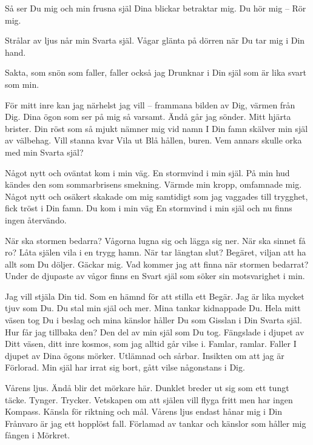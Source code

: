 Så ser Du mig och min frusna själ
Dina blickar betraktar mig.
Du hör mig – 
Rör mig.


Strålar av ljus når min
Svarta själ.
Vågar glänta på dörren
när Du tar mig i Din hand.


Sakta, som snön som faller,
faller också jag
Drunknar i Din själ
som är lika svart som min.
\stoppoem

\startpoem
För mitt inre kan jag
närhelst jag vill – 
frammana bilden av Dig,
värmen från Dig.
Dina ögon som ser på mig
så varsamt.
Ändå går jag sönder.
Mitt hjärta brister.
Din röst som så mjukt
nämner mig vid namn
I Din famn skälver min själ
av välbehag.
Vill stanna kvar
Vila ut
Blå hållen, buren.
Vem annars skulle orka med min
Svarta själ?
\stoppoem

\startpoem
Något nytt och oväntat
kom i min väg.
En stormvind i min själ.
På min hud kändes den som 
sommarbrisens smekning.
Värmde min kropp,
omfamnade mig.
Något nytt och osäkert
skakade om mig
samtidigt som jag vaggades till
trygghet,
fick tröst i Din famn.
Du kom i min väg
En stormvind i min själ
och nu finns ingen
återvändo.
\stoppoem

\startpoem
När ska stormen bedarra?
Vågorna lugna sig och lägga sig ner.
När ska sinnet få ro?
Låta själen vila i en trygg hamn.
När tar längtan slut?
Begäret, viljan att ha allt som 
Du döljer.
Gäckar mig.
Vad kommer jag att finna när 
stormen bedarrat?
Under de djupaste av vågor
finns en Svart själ 
som söker sin motsvarighet i min.
\stoppoem

\startpoem
Jag vill stjäla Din tid.
Som en hämnd för att stilla ett
Begär.
Jag är lika mycket tjuv som Du.
Du stal min själ och mer.
Mina tankar kidnappade Du.
Hela mitt väsen tog Du i beslag och 
mina känslor håller Du som 
Gisslan i Din
Svarta själ.
Hur får jag tillbaka den?
Den del av min själ som Du tog.
Fängslade i djupet av Ditt väsen, ditt inre kosmos,
som jag alltid går vilse i.
Famlar, ramlar.
Faller
I djupet av Dina ögons mörker.
Utlämnad och sårbar.
Insikten om att jag är 
Förlorad.
Min själ har irrat sig bort,
gått vilse någonstans
i Dig.
\stoppoem

\startpoem
Vårens ljus.
Ändå blir det mörkare här.
Dunklet breder ut sig som ett tungt täcke.
Tynger. Trycker.
Vetskapen om att själen vill flyga fritt men har ingen
Kompass.
Känsla för riktning och mål.
Vårens ljus endast hånar mig i Din 
Frånvaro är jag ett hopplöst fall.
Förlamad av tankar och känslor
som håller mig fången i 
Mörkret.


